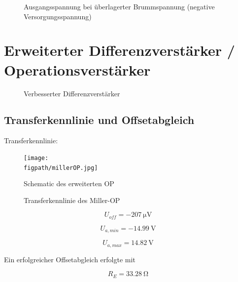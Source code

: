 \begin{figure}[H]
	\centering \small
	\scalebox{0.9}{}
	\caption{Ausgangsspannung bei überlagerter Brummspannung (negative Versorgungsspannung)}
	\label{fig_Kap5_12:Brumm}
\end{figure}


\section{Erweiterter Differenzverstärker / Operationsverstärker}

\begin{figure}[H]
	\centering
	\def\svgwidth{0.9\textwidth}
	
	\caption{Verbesserter Differenzverstärker} 
	\label{fig_Kap5_13:Miller} 
\end{figure}

\subsection{Transferkennlinie und Offsetabgleich}
Transferkennlinie:

\begin{figure}[H]
    \centering
    \texttt{[image: \\figpath/millerOP.jpg]}
    \caption{Schematic des erweiterten OP}
    \label{fig_Kap5_14:SpiceSchematic}
\end{figure}

\begin{figure}[H]
	\centering \small
	\scalebox{0.9}{}
	\caption{Transferkennlinie des Miller-OP}
	\label{fig_Kap5_15:transfer}
\end{figure}

\begin{equation}
    U_{off} = -\SI{207}{\micro\volt}
\end{equation}

\begin{equation}
    U_{a,min} = -\SI{14.99}{\volt}
\end{equation}

\begin{equation}
    U_{a,max} = \SI{14.82}{\volt}
\end{equation}

Ein erfolgreicher Offsetabgleich erfolgte mit 

\begin{equation}
    R_E = \SI{33,28}{\ohm}
\end{equation}

